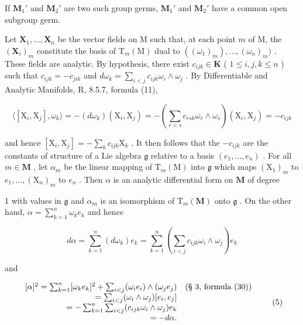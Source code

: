 If \(\mathbf{M}_1'\) and \(\mathbf{M}_2'\) are two such group germs, \(\mathbf{M}_1'\) and \(\mathbf{M}_2'\) have a common open subgroup germ.

Let \(\mathbf{X}_1, \ldots, \mathbf{X}_n\) be the vector fields on M such that, at each point \(m\) of M, the \((\mathbf{X}_i)_m\) constitute the basis of \(\mathrm{T}_m(\mathrm{M})\) dual to \(((\omega_1)_m), \ldots, (\omega_n)_m)\) . These fields are analytic. By hypothesis, there exist \(c_{ijk} \in \mathbf{K}\) ( \(1 \leqslant i,j, k \leqslant n\) ) such that \(c_{ijk} = -c_{jik}\) and \(d\omega_k = \sum_{i < j} c_{ijk}\omega_i \wedge \omega_j\) . By Differentiable and Analytic Manifolds, R, 8.5.7, formula (11),

\[
\langle [ \mathrm{X} _ {i}, \mathrm{X} _ {j} ], \omega_ {k} \rangle = - (d \omega_ {k}) (\mathrm{X} _ {i}, \mathrm{X} _ {j}) = - \left(\sum_ {r <   s} c _ {r s k} \omega_ {r} \wedge \omega_ {s}\right) (\mathrm{X} _ {i}, \mathrm{X} _ {j}) = - c _ {i j k}
\]

and hence \([\mathrm{X}_i,\mathrm{X}_j] = -\sum_{k}c_{ijk}\mathrm{X}_k\) . It then follows that the \(-c_{ijk}\) are the constants of structure of a Lie algebra \(\mathfrak{g}\) relative to a basis \((e_1,\dots ,e_n)\) . For all \(m\in \mathbf{M}\) , let \(\alpha_{m}\) be the linear mapping of \(\mathrm{T}_{m}(\mathrm{M})\) into \(\mathfrak{g}\) which maps \((\mathrm{X}_1)_m\) to \(e_1,\ldots ,(\mathrm{X}_n)_m\) to \(e_n\) . Then \(\alpha\) is an analytic differential form on \(\mathbf{M}\) of degree

1 with values in \(\mathfrak{g}\) and \(\alpha_{m}\) is an isomorphism of \(\mathrm{T}_m(\mathbf{M})\) onto \(\mathfrak{g}\) . On the other hand, \(\alpha = \sum_{k=1}^{n} \omega_k e_k\) and hence

\[
d \alpha = \sum_ {k = 1} ^ {n} (d \omega_ {k}) e _ {k} = \sum_ {k = 1} ^ {n} \left(\sum_ {i <   j} c _ {i j k} \omega_ {i} \wedge \omega_ {j}\right) e _ {k}
\]

and

\[
\begin{array}{r l} {[ \alpha ] ^ {2} = \sum_ {k = 1} ^ {n} [ \omega_ {k} e _ {k} ] ^ {2} + \sum_ {i <   j} (\omega_ {i} e _ {i}) \wedge (\omega_ {j} e _ {j})} & {\text {(§ 3, formula (30))}} \\ {= \sum_ {i <   j} (\omega_ {i} \wedge \omega _ {j}) [ e _ {i}, e _ {j} ]} \\ {= - \sum_ {k = 1} ^ {n} \sum_ {i <   j} (c _ {i j k} \omega_ {i} \wedge \omega_ {j}) e _ {k}} \\ {= - d \alpha.} \end{array}\tag{5}
\]

